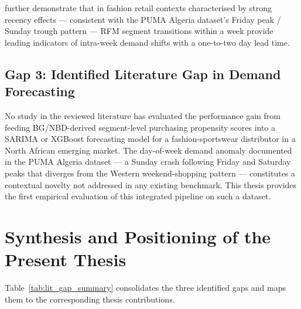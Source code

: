 \cite{AITU2022} further demonstrate that in fashion retail contexts characterised by strong recency effects — consistent with the PUMA Algeria dataset's Friday peak / Sunday trough pattern — RFM segment transitions within a week provide leading indicators of intra-week demand shifts with a one-to-two day lead time.

\subsection{Gap 3: Identified Literature Gap in Demand Forecasting}

\begin{tcolorbox}[colback=gray!10, colframe=black, title=\textbf{Literature Gap — Demand Forecasting}, fonttitle=\bfseries]
No study in the reviewed literature has evaluated the performance gain from feeding BG/NBD-derived segment-level purchasing propensity scores into a SARIMA or XGBoost forecasting model for a fashion-sportswear distributor in a North African emerging market. The day-of-week demand anomaly documented in the PUMA Algeria dataset — a Sunday crash following Friday and Saturday peaks that diverges from the Western weekend-shopping pattern — constitutes a contextual novelty not addressed in any existing benchmark. This thesis provides the first empirical evaluation of this integrated pipeline on such a dataset.
\end{tcolorbox}

\section{Synthesis and Positioning of the Present Thesis}

Table~\ref{tab:lit_gap_summary} consolidates the three identified gaps and maps them to the corresponding thesis contributions.

